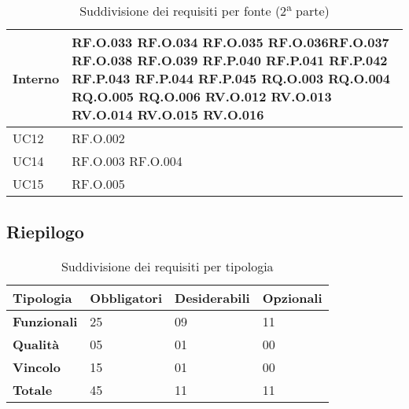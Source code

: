 \begin{table}[H]
\centering
    \begin{tabular}{|C{3.0cm}|C{3.0cm}|}
        \hline
          Interno & 
          RF.O.033  \newline RF.O.034  \newline RF.O.035  \newline  RF.O.036\newline RF.O.037 \newline
          RF.O.038  \newline RF.O.039  \newline RF.P.040  \newline  RF.P.041 \newline RF.P.042 \newline
          RF.P.043  \newline RF.P.044 \newline RF.P.045  \newline  RQ.O.003  \newline RQ.O.004  \newline
          RQ.O.005  \newline RQ.O.006  \newline RV.O.012  \newline  RV.O.013   \newline RV.O.014   \newline
          RV.O.015   \newline RV.O.016   \\
          \hline       
          UC12 & RF.O.002 \\
          \hline 
          UC14 & RF.O.003  \newline RF.O.004 \\
          \hline 
          UC15 & RF.O.005 \\
          \hline
    \end{tabular}
    \caption{Suddivisione dei requisiti per fonte (2\textsuperscript{a} parte)}
\end{table}

\subsection{Riepilogo}
\begin{table}[H]
\centering
    \begin{tabular}{|C{3.0cm}|C{2.5cm}|C{2.5cm}|C{2.5cm}|}
        \hline
         \textbf{Tipologia} &
         \textbf{Obbligatori} & 
         \textbf{Desiderabili} &
         \textbf{Opzionali} 
          \\
          \hline
          \textbf{Funzionali} & 25 & 09 & 11 \\
          \hline 
          \textbf{Qualità} & 05 & 01 & 00\\
          \hline
          \textbf{Vincolo} & 15 & 01 & 00\\
          \hline
          \textbf{Totale} & 45 & 11 & 11\\
          \hline
    \end{tabular}
    \caption{Suddivisione dei requisiti per tipologia}
\end{table}
